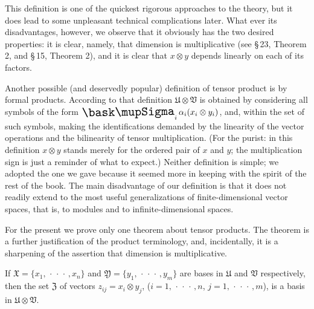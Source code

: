 This definition is one of the quickest rigorous approaches to the theory, but it
does lead to some unpleasant technical complications later. What ever its
disadvantages, however, we observe that it obviously has the two desired
properties: it is clear, namely, that dimension is multiplicative (see \S\,23,
Theorem 2, and \S\,15, Theorem 2), and it is clear that \(x \otimes y\) depends
linearly on each of its factors.

Another possible (and deservedly popular) definition of tensor product is by
formal products. According to that definition \(\mathfrak{U} \otimes
\mathfrak{V}\) is obtained by considering all symbols of the form \(\sumx_i
\alpha_i (x_i \otimes y_i)\), and, within the set of such symbols, making the
identifications demanded by the linearity of the vector operations and the
bilinearity of tensor multiplication. (For the purist: in this definition \(x
\otimes y\) stands merely for the ordered pair of \(x\) and \(y\); the
multiplication sign is just a reminder of what to expect.) Neither definition is
simple; we adopted the one we gave because it seemed more in keeping with the
spirit of the rest of the book. The main disadvantage of our definition is that
it does not readily extend to the most useful generalizations of
finite-dimensional vector spaces, that is, to modules and to
infinite-dimensional spaces.

For the present we prove only one theorem about tensor products. The theorem is a further justification of the product terminology, and, incidentally, it is a sharpening of the assertion that dimension is multiplicative.

\begin{theorem}
    If \(\mathfrak{X} = \{x_1, \,\cdot\,\cdot\,\cdot\,, x_n\}\) and \(\mathfrak{Y} = \{y_1, \,\cdot\,\cdot\,\cdot\,, y_m\}\) are bases in \(\mathfrak{U}\) and \(\mathfrak{V}\) respectively, then the set \(\mathfrak{Z}\) of vectors \(z_{ij} = x_i \otimes y_j\), (\(i = 1, \,\cdot\,\cdot\,\cdot\,, n\), \(j = 1, \,\cdot\,\cdot\,\cdot\,, m\)), is a basis in \(\mathfrak{U} \otimes \mathfrak{V}\).
\end{theorem}

